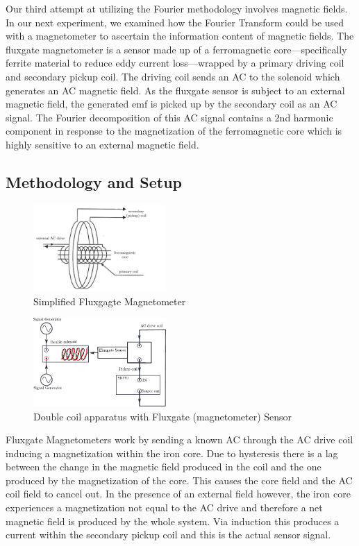 \documentclass[prl,twocolumn,superscriptaddress,floatfix]{revtex4}
\begin{document}
Our third attempt at utilizing the Fourier methodology involves magnetic fields. 
In our next experiment, we examined how the Fourier Transform could be used with a magnetometer to ascertain the information content of magnetic fields.
The fluxgate magnetometer is a sensor made up of a ferromagnetic core---specifically ferrite material to reduce eddy current loss---wrapped by a primary driving coil and secondary pickup coil. The driving coil sends an AC to the solenoid which generates an AC magnetic field. As the fluxgate sensor is subject to an external magnetic field, the generated emf is picked up by the secondary coil as an AC signal. The Fourier decomposition of this AC signal contains a 2nd harmonic component in response to the magnetization of the ferromagnetic core which is highly sensitive to an external magnetic field.

\subsection{Methodology and Setup}
\begin{figure}[H]
    \includegraphics[width=0.45\textwidth]{exp3_1.pdf}
    \caption{Simplified Fluxgagte Magnetometer}
    \label{fig:fluxgate}
\end{figure}

\begin{figure}[H]
    \includegraphics[width=0.45\textwidth]{exp3_2.pdf}
    \caption{Double coil apparatus with Fluxgate (magnetometer) Sensor}
    \label{fig:doublecoil}
\end{figure}
Fluxgate Magnetometers work by sending a known AC through the AC drive coil inducing a magnetization within the iron core. Due to hysteresis there is a lag between the change in the magnetic field produced in the coil and the one produced by the magnetization of the core. This causes the core field and the AC coil field to cancel out. In the presence of an external field however, the iron core experiences a magnetization not equal to the AC drive and therefore a net magnetic field is produced by the whole system. Via induction this produces a current within the secondary pickup coil and this is the actual sensor signal. 
\end{document}
